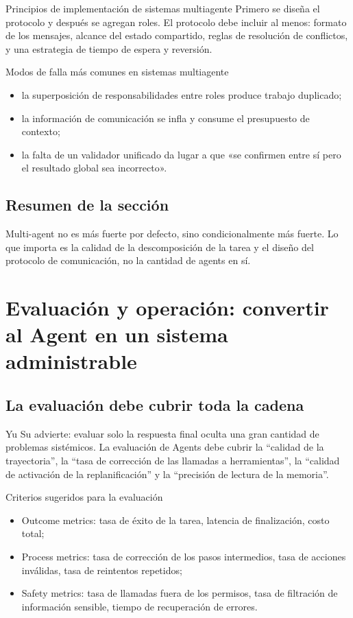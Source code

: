 \documentclass[a4paper]{article}
\begin{document}
\begin{importantbox}{Principios de implementación de sistemas multiagente}
Primero se diseña el protocolo y después se agregan roles. El protocolo debe incluir al menos: formato de los mensajes, alcance del estado compartido, reglas de resolución de conflictos, y una estrategia de tiempo de espera y reversión.
\end{importantbox}

\begin{warningbox}{Modos de falla más comunes en sistemas multiagente}
\begin{itemize}
    \item la superposición de responsabilidades entre roles produce trabajo duplicado;
    \item la información de comunicación se infla y consume el presupuesto de contexto;
    \item la falta de un validador unificado da lugar a que «se confirmen entre sí pero el resultado global sea incorrecto».
\end{itemize}
\end{warningbox}

\subsection{Resumen de la sección}
Multi-agent no es más fuerte por defecto, sino condicionalmente más fuerte. Lo que importa es la calidad de la descomposición de la tarea y el diseño del protocolo de comunicación, no la cantidad de agents en sí.

\section{Evaluación y operación: convertir al Agent en un sistema administrable}

\subsection{La evaluación debe cubrir toda la cadena}
Yu Su advierte: evaluar solo la respuesta final oculta una gran cantidad de problemas sistémicos. La evaluación de Agents debe cubrir la ``calidad de la trayectoria'', la ``tasa de corrección de las llamadas a herramientas'', la ``calidad de activación de la replanificación'' y la ``precisión de lectura de la memoria''.

\begin{importantbox}{Criterios sugeridos para la evaluación}
\begin{itemize}
    \item Outcome metrics: tasa de éxito de la tarea, latencia de finalización, costo total;
    \item Process metrics: tasa de corrección de los pasos intermedios, tasa de acciones inválidas, tasa de reintentos repetidos;
    \item Safety metrics: tasa de llamadas fuera de los permisos, tasa de filtración de información sensible, tiempo de recuperación de errores.
\end{itemize}
\end{importantbox}
\end{document}
